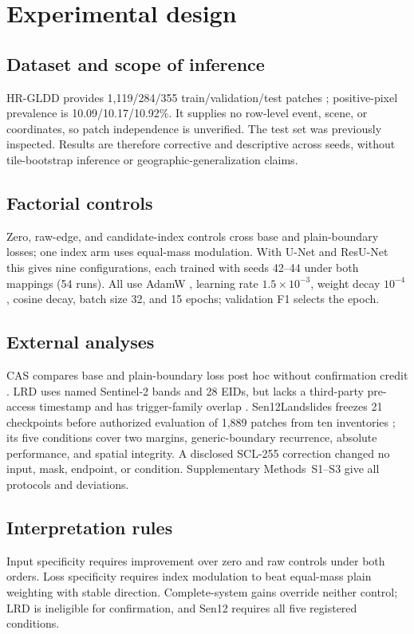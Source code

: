 \section{Experimental design}
\label{sec:setup}

\subsection{Dataset and scope of inference}

HR-GLDD provides 1,119/284/355 train/validation/test patches
\citep{meena2023hrgldd}; positive-pixel prevalence is
10.09/10.17/10.92\%. It supplies no row-level event, scene, or coordinates, so
patch independence is unverified. The test set was previously inspected.
Results are therefore corrective and descriptive across seeds, without
tile-bootstrap inference or geographic-generalization claims.

\subsection{Factorial controls}

Zero, raw-edge, and candidate-index controls cross base and plain-boundary
losses; one index arm uses equal-mass modulation. With U-Net and ResU-Net this
gives nine configurations, each trained with seeds 42--44 under both mappings
(54 runs). All use AdamW \citep{loshchilov2019adamw}, learning rate
$1.5\times10^{-3}$, weight decay $10^{-4}$, cosine decay, batch size 32, and
15 epochs; validation F1 selects the epoch.

\subsection{External analyses}

CAS compares base and plain-boundary loss post hoc without confirmation credit
\citep{xu2024cas}. LRD uses named Sentinel-2 bands and 28 EIDs, but lacks a
third-party pre-access timestamp and has trigger-family overlap
\citep{orynbaikyzy2025lrd}. Sen12Landslides freezes 21 checkpoints before
authorized evaluation of 1,889 patches from ten inventories
\citep{hohn2025sen12}; its five conditions cover two margins, generic-boundary
recurrence, absolute performance, and spatial integrity. A disclosed SCL-255
correction changed no input, mask, endpoint, or condition. Supplementary
Methods~S1--S3 give all protocols and deviations.

\subsection{Interpretation rules}

Input specificity requires improvement over zero and raw controls under both
orders. Loss specificity requires index modulation to beat equal-mass plain
weighting with stable direction. Complete-system gains override neither
control; LRD is ineligible for confirmation, and Sen12 requires all five
registered conditions.
